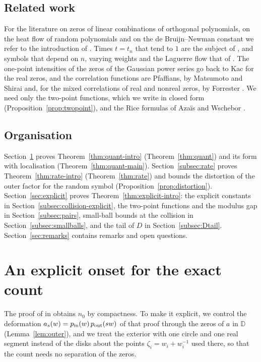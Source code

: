 \documentclass[11pt]{amsart}
\theoremstyle{definition}
\theoremstyle{remark}
\numberwithin{equation}{section}
\newcommand{\D}{\mathbb{D}}
\begin{document}
\subsection{Related work}
For the literature on zeros of linear combinations of orthogonal polynomials, on the heat flow of random polynomials and on the de Bruijn--Newman constant we refer to the introduction of \cite{Main}. Times $t=t_n$ that tend to $1$ are the subject of \cite{CompB}, and symbols that depend on $n$, varying weights and the Laguerre flow that of \cite{CompC}. The one-point intensities of the zeros of the Gaussian power series go back to Kac \cite{Ka} for the real zeros, and the correlation functions are Pfaffians, by Matsumoto and Shirai \cite{MS} and, for the mixed correlations of real and nonreal zeros, by Forrester \cite{Fo}. We need only the two-point functions, which we write in closed form (Proposition~\ref{prop:twopoint}), and the Rice formulas of Aza\"is and Wschebor \cite{AW}.

\subsection{Organisation}
Section~\ref{subsec:onset} proves Theorem~\ref{thm:quant-intro} (Theorem~\ref{thm:quant}) and its form with localisation (Theorem~\ref{thm:quant-main}). Section~\ref{subsec:rate} proves Theorem~\ref{thm:rate-intro} (Theorem~\ref{thm:rate}) and bounds the distortion of the outer factor for the random symbol (Proposition~\ref{prop:distortion}). Section~\ref{sec:explicit} proves Theorem~\ref{thm:explicit-intro}: the explicit constants in Section~\ref{subsec:collision-explicit}, the two-point functions and the modulus gap in Section~\ref{subsec:pairs}, small-ball bounds at the collision in Section~\ref{subsec:smallballs}, and the tail of $D$ in Section~\ref{subsec:Dtail}. Section~\ref{sec:remarks} contains remarks and open questions.

\section{An explicit onset for the exact count}\label{subsec:onset}

The proof of \cite[Theorem~\ref{M-thm:main}]{Main} in \cite[Section~\ref{M-sec:proof}]{Main} obtains $n_0$ by compactness. To make it explicit, we control the deformation $a_s(w)=p_{\rm in}(w)\,p_{\rm out}(sw)$ of that proof through the zeros of $a$ in $\D$ (Lemma~\ref{lem:outer}), and we treat the exterior with one circle and one real segment instead of the disks about the points $\zeta_i=w_i+w_i^{-1}$ used there, so that the count needs no separation of the zeros.
\end{document}
